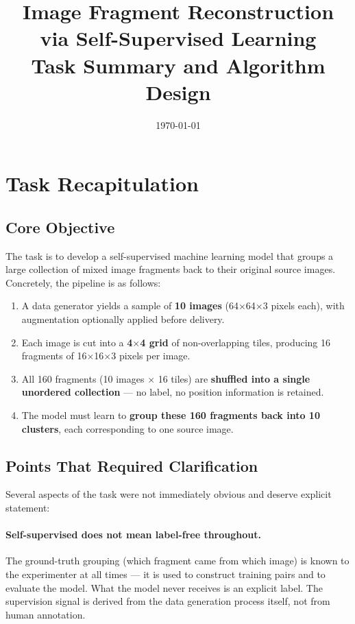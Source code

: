 \documentclass[12pt, a4paper]{article}
\title{Image Fragment Reconstruction via Self-Supervised Learning\\
\large Task Summary and Algorithm Design}
\author{}
\date{\today}
\begin{document}
\maketitle
\tableofcontents
\newpage

\section{Task Recapitulation}

\subsection{Core Objective}

The task is to develop a self-supervised machine learning model that groups a large
collection of mixed image fragments back to their original source images.
Concretely, the pipeline is as follows:

\begin{enumerate}
    \item A data generator yields a sample of \textbf{10 images} (64$\times$64$\times$3 pixels each),
          with augmentation optionally applied before delivery.
    \item Each image is cut into a \textbf{4$\times$4 grid} of non-overlapping tiles,
          producing 16 fragments of 16$\times$16$\times$3 pixels per image.
    \item All 160 fragments (10 images $\times$ 16 tiles) are \textbf{shuffled into a single
          unordered collection} — no label, no position information is retained.
    \item The model must learn to \textbf{group these 160 fragments back into 10 clusters},
          each corresponding to one source image.
\end{enumerate}

\subsection{Points That Required Clarification}

Several aspects of the task were not immediately obvious and deserve explicit statement:

\paragraph{Self-supervised does not mean label-free throughout.}
The ground-truth grouping (which fragment came from which image) is known to the
experimenter at all times — it is used to construct training pairs and to evaluate the
model. What the model never receives is an explicit label. The supervision signal
is derived from the data generation process itself, not from human annotation.
\end{document}
